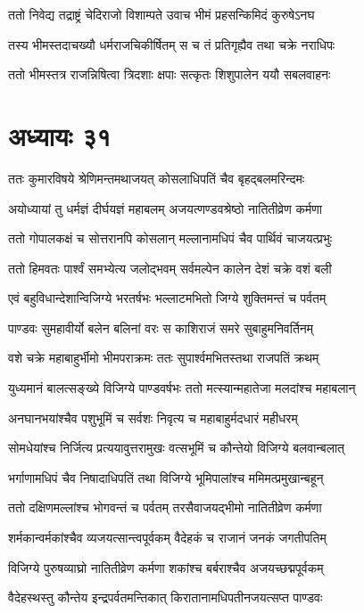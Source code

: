 \threelineshloka
{ततो निवेद्य तद्राष्ट्रं चेदिराजो विशाम्पते}
{उवाच भीमं प्रहसन्किमिदं कुरुषेऽनघ}
{}


\twolineshloka
{तस्य भीमस्तदाचख्यौ धर्मराजचिकीर्षितम्}
{स च तं प्रतिगृह्यैव तथा चक्रे नराधिपः}


\twolineshloka
{ततो भीमस्तत्र राजन्निषित्वा त्रिदशाः क्षपाः}
{सत्कृतः शिशुपालेन ययौ सबलवाहनः}


\chapter{अध्यायः ३१}
\twolineshloka
{ततः कुमारविषये श्रेणिमन्तमथाजयत्}
{कोसलाधिपतिं चैव बृहद्बलमरिन्दमः}


\twolineshloka
{अयोध्यायां तु धर्मज्ञं दीर्घयज्ञं महाबलम्}
{अजयत्णण्डवश्रेष्ठो नातितीव्रेण कर्मणा}


\twolineshloka
{ततो गोपालकक्षं च सोत्तरानपि कोसलान्}
{मल्लानामधिपं चैव पार्थिवं चाजयत्प्रभुः}


\twolineshloka
{ततो हिमवतः पार्श्वं समभ्येत्य जलोद्भवम्}
{सर्वमल्पेन कालेन देशं चक्रे वशं बली}


\twolineshloka
{एवं बहुविधान्देशान्विजिग्ये भरतर्षभः}
{भल्लाटमभितो जिग्ये शुक्तिमन्तं च पर्वतम्}


\twolineshloka
{पाण्डवः सुमहावीर्यो बलेन बलिनां वरः}
{स काशिराजं समरे सुबाहुमनिवर्तिनम्}


\twolineshloka
{वशे चक्रे महाबाहुर्भीमो भीमपराक्रमः}
{ततः सुपार्श्वमभितस्तथा राजपतिं क्रथम्}


\twolineshloka
{युध्यमानं बालत्सङ्ख्ये विजिग्ये पाण्डवर्षभः}
{ततो मत्स्यान्महातेजा मलदांश्च महाबलान्}


\twolineshloka
{अनघानभयांश्चैव पशुभूमिं च सर्वशः}
{निवृत्य च महाबाहुर्मदधारं महीधरम्}


\twolineshloka
{सोमधेयांश्च निर्जित्य प्रत्ययावुत्तरामुखः}
{वत्सभूमिं च कौन्तेयो विजिग्ये बलवान्बलात्}


\twolineshloka
{भर्गाणामधिपं चैव निषादाधिपतिं तथा}
{विजिग्ये भूमिपालांश्च ममिमत्प्रमुखान्बहून्}


\twolineshloka
{ततो दक्षिणमल्लांश्च भोगवन्तं च पर्वतम्}
{तरसैवाजयद्भीमो नातितीव्रेण कर्मणा}


\twolineshloka
{शर्मकान्वर्मकांश्चैव व्यजयत्सान्त्वपूर्वकम्}
{वैदेहकं च राजानं जनकं जगतीपतिम्}


\twolineshloka
{विजिग्ये पुरुषव्याघ्रो नातितीव्रेण कर्मणा}
{शकांश्च बर्बराश्चैव अजयच्छद्मपूर्वकम्}


\twolineshloka
{वैदेहस्थस्तु कौन्तेय इन्द्रपर्वतमन्तिकात्}
{किरातानामधिपतीनजयत्सप्त पाण्डवः}


